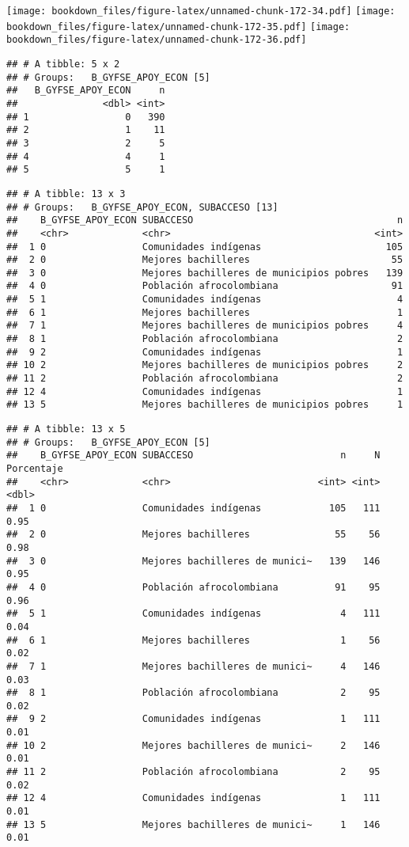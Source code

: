 \documentclass[]{article}
\theoremstyle{definition}
\theoremstyle{definition}
\theoremstyle{definition}
\theoremstyle{remark}
\begin{document}
\texttt{[image: bookdown\_files/figure-latex/unnamed-chunk-172-34.pdf]}
\texttt{[image: bookdown\_files/figure-latex/unnamed-chunk-172-35.pdf]}
\texttt{[image: bookdown\_files/figure-latex/unnamed-chunk-172-36.pdf]}

\begin{verbatim}
## # A tibble: 5 x 2
## # Groups:   B_GYFSE_APOY_ECON [5]
##   B_GYFSE_APOY_ECON     n
##               <dbl> <int>
## 1                 0   390
## 2                 1    11
## 3                 2     5
## 4                 4     1
## 5                 5     1
\end{verbatim}

\begin{verbatim}
## # A tibble: 13 x 3
## # Groups:   B_GYFSE_APOY_ECON, SUBACCESO [13]
##    B_GYFSE_APOY_ECON SUBACCESO                                    n
##    <chr>             <chr>                                    <int>
##  1 0                 Comunidades indígenas                      105
##  2 0                 Mejores bachilleres                         55
##  3 0                 Mejores bachilleres de municipios pobres   139
##  4 0                 Población afrocolombiana                    91
##  5 1                 Comunidades indígenas                        4
##  6 1                 Mejores bachilleres                          1
##  7 1                 Mejores bachilleres de municipios pobres     4
##  8 1                 Población afrocolombiana                     2
##  9 2                 Comunidades indígenas                        1
## 10 2                 Mejores bachilleres de municipios pobres     2
## 11 2                 Población afrocolombiana                     2
## 12 4                 Comunidades indígenas                        1
## 13 5                 Mejores bachilleres de municipios pobres     1
\end{verbatim}

\begin{verbatim}
## # A tibble: 13 x 5
## # Groups:   B_GYFSE_APOY_ECON [5]
##    B_GYFSE_APOY_ECON SUBACCESO                          n     N Porcentaje
##    <chr>             <chr>                          <int> <int>      <dbl>
##  1 0                 Comunidades indígenas            105   111       0.95
##  2 0                 Mejores bachilleres               55    56       0.98
##  3 0                 Mejores bachilleres de munici~   139   146       0.95
##  4 0                 Población afrocolombiana          91    95       0.96
##  5 1                 Comunidades indígenas              4   111       0.04
##  6 1                 Mejores bachilleres                1    56       0.02
##  7 1                 Mejores bachilleres de munici~     4   146       0.03
##  8 1                 Población afrocolombiana           2    95       0.02
##  9 2                 Comunidades indígenas              1   111       0.01
## 10 2                 Mejores bachilleres de munici~     2   146       0.01
## 11 2                 Población afrocolombiana           2    95       0.02
## 12 4                 Comunidades indígenas              1   111       0.01
## 13 5                 Mejores bachilleres de munici~     1   146       0.01
\end{verbatim}
\end{document}
